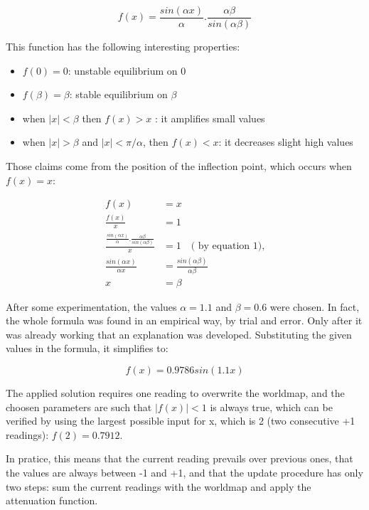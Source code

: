 \documentclass[a4paper,twocolumn]{article}
\begin{document}
    \begin{equation}
        f(x) = \frac{sin(\alpha x)}{\alpha} . \frac{\alpha\beta}{sin(\alpha\beta)}
    \end{equation}

    This function has the following interesting properties: 
    \begin{itemize}
        \item $f(0) = 0$: unstable equilibrium on 0
        \item $f(\beta) = \beta$: stable equilibrium on $\beta$
        \item when $|x| < \beta$ then $f(x) > x$ : it amplifies small values
        \item when $|x| > \beta$ and $|x|< \pi/\alpha$, then $f(x) < x $: it decreases slight high values
    \end{itemize}

    Those claims come from the position of the inflection point, which occurs when $f(x) = x$:

    \begin{align}
        f(x) &= x \\
        \frac{f(x)}{x} &= 1 \nonumber\\
        \frac{\frac{sin(\alpha x)}{\alpha} . \frac{\alpha\beta}{sin(\alpha\beta)}}{x} &= 1 \quad\text{( by equation 1),}  \nonumber\\
        \frac{sin(\alpha x)}{\alpha x} &= \frac{sin(\alpha\beta)}
        {\alpha\beta} \nonumber\\
        x &= \beta
    \end{align}

    After some experimentation, the values $\alpha = 1.1$ and $\beta = 0.6$ were chosen. In fact, the whole formula was found in an empirical way, by trial and error. Only after it was already working that an explanation was developed. Substituting the given values in the formula, it simplifies to:
    
    \begin{equation}
        f(x) = 0.9786 sin(1.1 x)
    \end{equation}

    The applied solution requires one reading to overwrite the worldmap, and the choosen parameters are such that $|f(x)| < 1$ is always true, which can be verified by using the largest possible input for x, which is 2 (two consecutive +1 readings): $f(2) = 0.7912$.
    
    In pratice, this means that the current reading prevails over previous ones, that the values are always between -1 and +1, and that the update procedure has only two steps: sum the current readings with the worldmap and apply the attenuation function.
    
\end{document}
